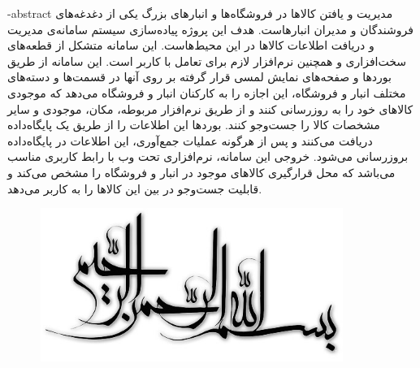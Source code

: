 

\fa-abstract{
مدیریت و یافتن کالاها در فروشگاه‌ها و انبار‌های بزرگ یکی از دغدغه‌های فروشندگان و مدیران انبارهاست. هدف این پروژه پیاده‌سازی سیستم سامانه‌ی مدیریت و دریافت اطلاعات کالاها در این محیط‌هاست. این سامانه متشکل از قطعه‌های سخت‌افزاری و همچنین نرم‌افزار لازم برای تعامل با کاربر است. این سامانه از طریق بوردها و صفحه‌های نمایش لمسی قرار گرفته بر روی آنها در قسمت‌ها و دسته‌های مختلف انبار و فروشگاه، این اجازه را به کارکنان انبار و فروشگاه می‌دهد که موجودی کالا‌های خود را به روز‌رسانی کنند و از طریق نرم‌افزار مربوطه، مکان، موجودی و سایر مشخصات کالا را جست‌و‌جو کنند. بوردها این اطلاعات را از طریق یک پایگاه‌داده دریافت می‌کنند و پس از هرگونه عملیات جمع‌آوری، این اطلاعات در پایگاه‌داده بروزرسانی می‌شود. خروجی این سامانه، نرم‌افزاری تحت وب با رابط کاربری مناسب ‌می‌باشد که محل قرارگیری کالا‌های موجود در انبار و فروشگاه را مشخص می‌کند و قابلیت جست‌و‌جو در بین این کالا‌ها را به کاربر می‌دهد.
}





\AUTtitle
\vspace*{7cm}
\thispagestyle{empty}
\begin{center}
\includegraphics[height=5cm,width=12cm]{besm}
\end{center}